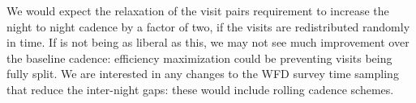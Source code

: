 We would expect the relaxation of the visit pairs requirement to
increase the  night to night cadence by a factor of two, if the visits
are redistributed randomly in time. If \OpSim is not being as liberal as
this, we may not see much improvement over the baseline cadence:
efficiency maximization could be preventing visits being fully split. We
are interested in any changes to the WFD survey time sampling that
reduce the inter-night gaps: these  would include rolling cadence
schemes.



\navigationbar


